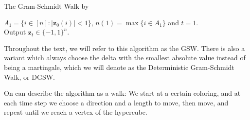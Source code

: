 \documentclass[12pt]{article}
\begin{document}
\begin{algorithm}[H]
{\fontsize{10}{12}
\caption{The Gram-Schmidt Walk by \cite{blues}}
   $A_1=\{i\in[n]:|\textbf{z}_0(i)|<1\}$, $n(1) = \max \{i \in A_1\}$ and $t=1$.\\
    Output $\textbf{z}_t\in\{-1,1\}^n$.
    \label{walk}
    }%
    \end{algorithm}
Throughout the text, we will refer to this algorithm as the GSW. There is also a variant which always choose the delta with the smallest absolute value instead of being a martingale, which we will denote as the Deterministic Gram-Schmidt Walk, or DGSW. 

On can describe the algorithm as a walk: We start at a certain coloring, and at each time step we choose a direction and a length to move, then move, and repeat until we reach a vertex of the hypercube.
\end{document}
